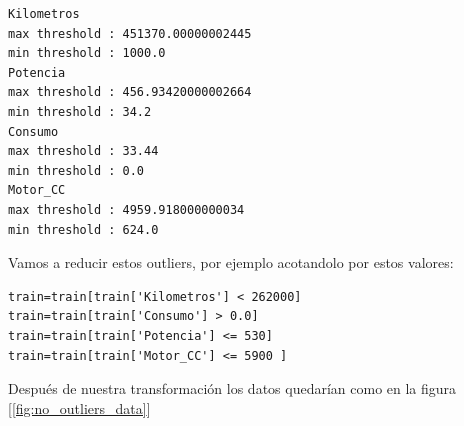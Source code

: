 \documentclass[12pt,twoside]{report}
\begin{document}
\begin{lstlisting}
Kilometros
max threshold : 451370.00000002445
min threshold : 1000.0
Potencia
max threshold : 456.93420000002664
min threshold : 34.2
Consumo
max threshold : 33.44
min threshold : 0.0
Motor_CC
max threshold : 4959.918000000034
min threshold : 624.0
\end{lstlisting}

Vamos a reducir estos outliers, por ejemplo acotandolo por estos valores:

\begin{lstlisting}
train=train[train['Kilometros'] < 262000]             
train=train[train['Consumo'] > 0.0]        
train=train[train['Potencia'] <= 530]
train=train[train['Motor_CC'] <= 5900 ]
\end{lstlisting}

Después de nuestra transformación los datos quedarían como en la figura [\ref{fig:no_outliers_data}]
\end{document}
